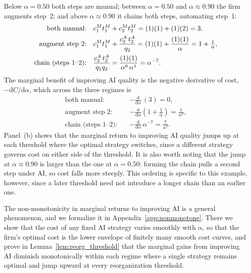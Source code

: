 \begin{example}
Below $\alpha = 0.50$ both steps are manual; between $\alpha = 0.50$ and $\alpha \approx 0.90$ the firm augments step~2; and above $\alpha \approx 0.90$ it chains both steps, automating step~1:
\begin{align*}
\text{both manual:} \quad & c^{M}_{1}t^{M}_{1} + c^{M}_{2}t^{M}_{2} = (1)(1) + (1)(2) = 3, \\
\text{augment step 2:} \quad & c^{M}_{1}t^{M}_{1} + \frac{c^{A}_{2}\,t^{A}_{2}}{q_2} = (1)(1) + \frac{(1)(1)}{\alpha} = 1 + \tfrac{1}{\alpha}, \\
\text{chain (steps 1--2):} \quad & \frac{c^{A}_{2}\,t^{A}_{2}}{q_1 q_2} = \frac{(1)(1)}{\alpha^{6}\,\alpha^{1}} = \alpha^{-7}.
\end{align*}
The marginal benefit of improving AI quality is the negative derivative of cost, $-\mathrm{d}C/\mathrm{d}\alpha$, which across the three regimes is
\begin{align*}
\text{both manual:} \quad & -\frac{\mathrm{d}}{\mathrm{d}\alpha}\,(3) = 0, \\
\text{augment step 2:} \quad & -\frac{\mathrm{d}}{\mathrm{d}\alpha}\!\left(1 + \frac{1}{\alpha}\right) = \frac{1}{\alpha^{2}}, \\
\text{chain (steps 1--2):} \quad & -\frac{\mathrm{d}}{\mathrm{d}\alpha}\,\alpha^{-7} = \frac{7}{\alpha^{8}}.
\end{align*}
Panel~(b) shows that the marginal return to improving AI quality jumps up at each threshold where the optimal strategy switches, since a different strategy governs cost on either side of the threshold.
It is also worth noting that the jump at $\alpha \approx 0.90$ is larger than the one at $\alpha = 0.50$: forming the chain pulls a second step under AI, so cost falls more steeply.
This ordering is specific to this example, however, since a later threshold need not introduce a longer chain than an earlier one.
\end{example}

The non-monotonicity in marginal returns to improving AI is a general phenomenon, and we formalize it in Appendix~\ref{app:nonmonotone}.
There we show that the cost of any fixed AI strategy varies smoothly with $\alpha$, so that the firm's optimal cost is the lower envelope of finitely many smooth cost curves, and prove in Lemma~\ref{lem:reorg_threshold} that the marginal gains from improving AI diminish monotonically within each regime where a single strategy remains optimal and jump upward at every reorganization threshold.
